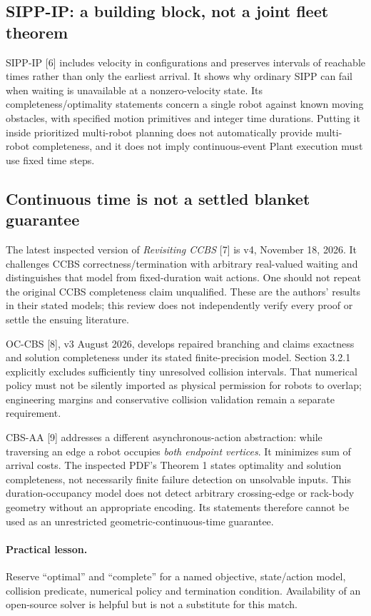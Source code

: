\documentclass[11pt,a4paper]{article}
\begin{document}
\subsection*{SIPP-IP: a building block, not a joint fleet theorem}
SIPP-IP [6] includes velocity in configurations and preserves intervals of
reachable times rather than only the earliest arrival. It shows why ordinary
SIPP can fail when waiting is unavailable at a nonzero-velocity state. Its
completeness/optimality statements concern a single robot against known moving
obstacles, with specified motion primitives and integer time durations.
Putting it inside prioritized multi-robot planning does not automatically
provide multi-robot completeness, and it does not imply continuous-event Plant
execution must use fixed time steps.

\subsection*{Continuous time is not a settled blanket guarantee}
The latest inspected version of \emph{Revisiting CCBS} [7] is v4, November 18,
2026. It challenges CCBS correctness/termination with arbitrary real-valued
waiting and distinguishes that model from fixed-duration wait actions.
One should not repeat the original CCBS completeness claim unqualified.
These are the authors' results in their stated models; this review does not
independently verify every proof or settle the ensuing literature.

OC-CBS [8], v3 August 2026, develops repaired branching and claims exactness
and solution completeness under its stated finite-precision model. Section
3.2.1 explicitly excludes sufficiently tiny unresolved collision intervals.
That numerical policy must not be silently imported as physical permission
for robots to overlap; engineering margins and conservative collision
validation remain a separate requirement.

CBS-AA [9] addresses a different asynchronous-action abstraction: while
traversing an edge a robot occupies \emph{both endpoint vertices}. It minimizes
sum of arrival costs. The inspected PDF's Theorem 1 states optimality and
solution completeness, not necessarily finite failure detection on unsolvable
inputs. This duration-occupancy model does not detect arbitrary crossing-edge
or rack-body geometry without an appropriate encoding. Its statements therefore
cannot be used as an unrestricted geometric-continuous-time guarantee.

\paragraph{Practical lesson.}
Reserve ``optimal'' and ``complete'' for a named objective, state/action model,
collision predicate, numerical policy and termination condition. Availability
of an open-source solver is helpful but is not a substitute for this match.
\end{document}

